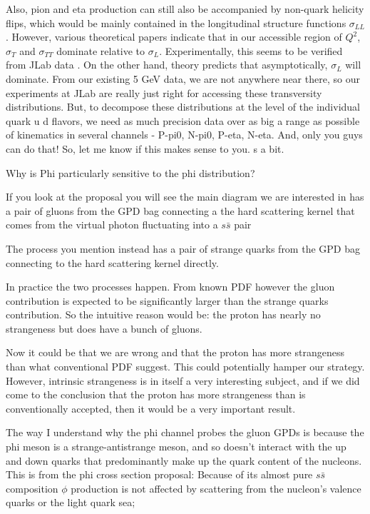     	Also, pion and eta production can still also be accompanied by non-quark helicity flips, which would be mainly contained in the longitudinal structure functions $\sigma_{LL}$. However, various theoretical papers indicate that in our accessible region of $Q^2$, $\sigma_T$ and $\sigma_{TT}$ dominate relative to $\sigma_L$. Experimentally, this seems to be verified from JLab data .
    	On the other hand, theory predicts that asymptotically, $\sigma_L$ will dominate. From our existing 5 GeV  data, we are not anywhere near there, so our experiments at JLab are really just right for accessing these transversity distributions.  But, to decompose these distributions  at the level of the individual quark u d flavors, we need as much precision data over as big a range as possible of kinematics in several channels - P-pi0, N-pi0, P-eta, N-eta. And, only you guys can do that!
    	So, let me know if this makes sense to you. s a bit. 
    	
        Why is Phi particularly sensitive to the phi distribution?

        If you look at the proposal you will see the main diagram we are interested in has a pair of gluons from the GPD bag connecting a the hard scattering kernel that comes from the virtual photon fluctuating into a $s\bar{s}$ pair
        
        The process you mention instead has a pair of strange quarks from the GPD bag connecting to the hard scattering kernel directly. 
        
        In practice the two processes happen. From known PDF however the gluon contribution is expected to be significantly larger than the strange quarks contribution. So the intuitive reason would be: the proton has nearly no strangeness but does have a bunch of gluons.
        
        Now it could be that we are wrong and that the proton has more strangeness than what conventional PDF suggest. This could potentially hamper our strategy. However, intrinsic strangeness is in itself a very interesting subject, and if we did come to the conclusion that the proton has more strangeness than is conventionally accepted, then it would be a very important result.
        
        The way I understand why the phi channel probes the gluon GPDs is because the phi meson is a strange-antistrange meson, and so doesn't interact with the up and down quarks that predominantly make up the quark content of the nucleons. This is from the phi cross section proposal: Because of its almost pure $s\bar{s}$ composition $\phi$ production is not affected by scattering from the nucleon’s valence quarks or the light quark sea;
        
